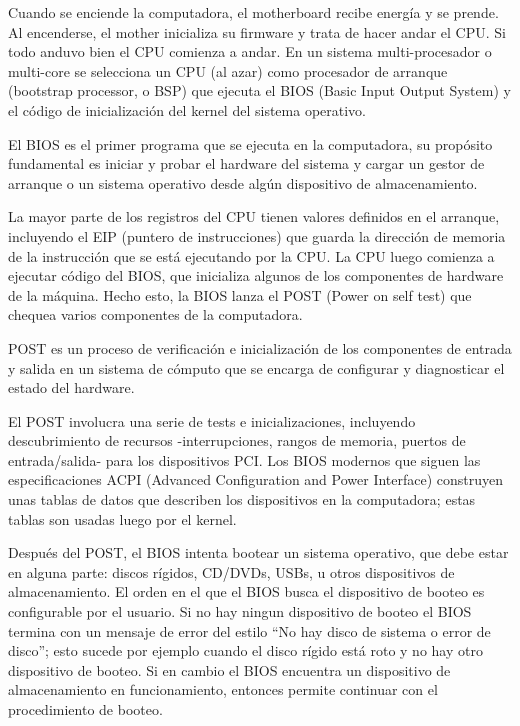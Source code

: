 Cuando se enciende la computadora, el motherboard recibe energía y se prende.
Al encenderse, el mother inicializa su firmware y trata de hacer andar el CPU.
Si todo anduvo bien el CPU comienza a andar. En un sistema multi-procesador
o multi-core se selecciona un CPU (al azar) como procesador de arranque
(bootstrap processor, o BSP) que ejecuta el BIOS (Basic Input Output System)
y el código de inicialización del kernel del sistema operativo. 


\begin{myframe}
    El BIOS es el primer programa que se ejecuta en la computadora,
    su propósito fundamental es iniciar y probar el hardware del sistema
    y cargar un gestor de arranque o un sistema operativo desde
    algún dispositivo de almacenamiento.
\end{myframe}

La mayor parte de los registros del CPU tienen valores definidos en el arranque,
incluyendo el EIP (puntero de instrucciones) que guarda la dirección de memoria
de la instrucción que se está ejecutando por la CPU. 
La CPU luego comienza a ejecutar código del BIOS, que inicializa algunos
de los componentes de hardware de la máquina. Hecho esto, la BIOS lanza
el POST (Power on self test) que chequea varios componentes de la computadora. 

\begin{myframe}
    POST es un proceso de verificación e inicialización de los componentes
    de entrada y salida en un sistema de cómputo que se encarga de configurar
    y diagnosticar el estado del hardware.
\end{myframe}

El POST involucra una serie de tests e inicializaciones, incluyendo descubrimiento
de recursos -interrupciones, rangos de memoria, puertos de entrada/salida-
para los dispositivos PCI. Los BIOS modernos que siguen las especificaciones
ACPI (Advanced Configuration and Power Interface) construyen unas tablas de
datos que describen los dispositivos en la computadora; estas tablas son usadas luego por el kernel.

Después del POST, el BIOS intenta bootear un sistema operativo, que debe estar en
alguna parte: discos rígidos, CD/DVDs, USBs, u otros dispositivos de almacenamiento.
El orden en el que el BIOS busca el dispositivo de booteo es configurable por el usuario.
Si  no hay ningun dispositivo de booteo el BIOS termina con un mensaje de error del estilo
\enquote{No hay disco de sistema o error de disco}; esto sucede por ejemplo cuando
el disco rígido está roto y no hay otro dispositivo de booteo.
Si en cambio el BIOS encuentra un dispositivo de almacenamiento en funcionamiento,
entonces permite continuar con el procedimiento de booteo.

